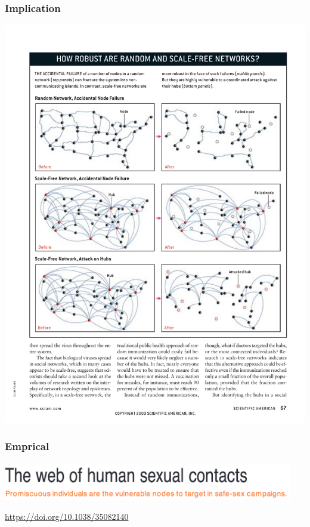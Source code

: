\documentclass[aspectratio=169]{beamer}
\begin{document}
\begin{frame}
\frametitle{Implication}

\begin{center}
\includegraphics[height = 0.80\textheight]{figures/barabasi_scale-free_2003_robust}
\end{center}

\end{frame}
\begin{frame}
\frametitle{Emprical}

\begin{center}
\includegraphics[width = 0.95\textwidth]{figures/liljeros_web_2001_title}
\end{center}

\vfill
\url{https://doi.org/10.1038/35082140}

\end{frame}
\end{document}
